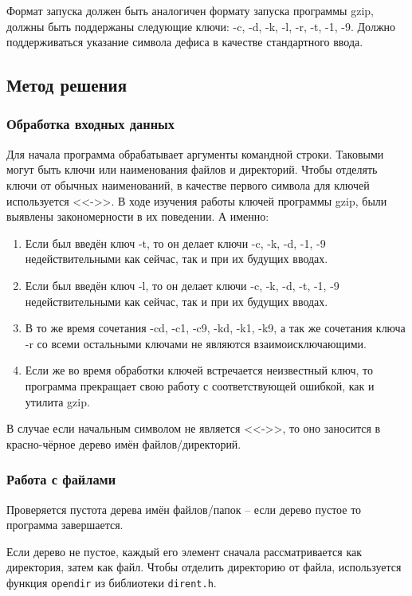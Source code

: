 \documentclass[12pt]{article}
\begin{document}
	Формат запуска должен быть аналогичен формату запуска программы gzip, должны быть поддержаны следующие ключи: -c, -d, -k, -l, -r, -t, -1, -9. Должно поддерживаться указание символа дефиса в качестве стандартного ввода.
	
	\subsection*{Метод решения}
	
	\subsubsection*{Обработка входных данных}
	
	Для начала программа обрабатывает аргументы командной строки. Таковыми могут быть ключи или наименования файлов и директорий. Чтобы отделять ключи от обычных наименований, в качестве первого символа для ключей используется <<->>. В ходе изучения работы ключей программы gzip, были выявлены закономерности в их поведении. А именно:
	
	\begin{enumerate}
		\item Если был введён ключ -t, то он делает ключи -c, -k, -d, -1, -9 недействительными как сейчас, так и при их будущих вводах.
		\item Если был введён ключ -l, то он делает ключи -c, -k, -d, -t, -1, -9 недействительными как сейчас, так и при их будущих вводах.
		\item В то же время сочетания -cd, -c1, -c9, -kd, -k1, -k9, а так же сочетания ключа -r со всеми остальными ключами не являются взаимоисключающими.
		\item Если же во время обработки ключей встречается неизвестный ключ, то программа прекращает свою работу с соответствующей ошибкой, как и утилита gzip.
	\end{enumerate}
	
	В случае если начальным символом не является <<->>, то оно заносится в красно-чёрное дерево имён файлов/директорий. 
	
	\subsubsection*{Работа с файлами}
	
	Проверяется пустота дерева имён файлов/папок -- если дерево пустое то программа завершается. 
	
	Если дерево не пустое, каждый его элемент сначала рассматривается как директория, затем как файл. Чтобы отделить директорию от файла, используется функция \texttt{opendir} из библиотеки \texttt{dirent.h}.
	
\end{document}
